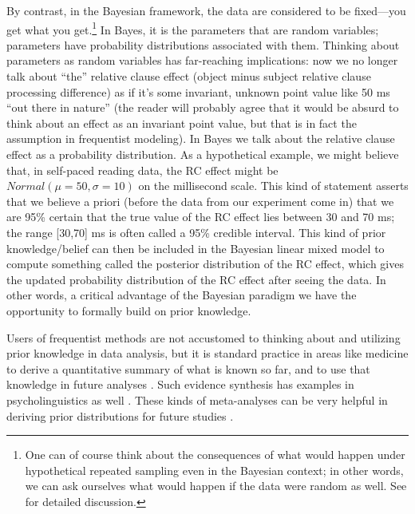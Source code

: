 \documentclass{ar-1col}\usepackage[]{graphicx}\usepackage[]{color}
\begin{document}
By contrast, in the Bayesian framework, the data are considered to be fixed---you get what you get.\footnote{One can of course think about the consequences of what would happen under hypothetical repeated sampling even in the Bayesian context; in other words, we can ask ourselves what would happen if the data were random as well. See \citet{SchadEtAlWorkflow,SchadEtAlBF,vasishth2021sample} for detailed discussion.} In Bayes, it is the parameters that are random variables; parameters have probability distributions associated with them. Thinking about parameters as random variables has far-reaching implications: now we no longer talk about ``the'' relative clause effect (object minus subject relative clause processing difference) as if it's some invariant, unknown point value like 50 ms ``out there in nature'' (the reader will probably agree that it would be absurd to think about an effect as an invariant point value, but that is in fact the assumption in frequentist modeling). 
In Bayes we talk about the relative clause effect as a probability distribution. As a hypothetical example, we might believe \citep[based on prior data or theory or computational modeling; see][for how such prior information can be derived]{ohagan2006uncertain,NicenboimEtAlBayes2019} that, in self-paced reading data, the RC effect might be $Normal(\mu=50,\sigma=10)$ on the millisecond scale. This kind of statement asserts that we believe a priori (before the data from our experiment come in) that we are 95\% certain that the true value of the RC effect lies between 30 and 70 ms; the range [30,70] ms is often called a 95\% credible interval. This kind of prior knowledge/belief can then be included in the Bayesian linear mixed model to compute something called the posterior distribution of the RC effect, which gives the updated probability distribution of the RC effect after seeing the data. In other words, a critical advantage of the Bayesian paradigm we have the opportunity to formally build on prior knowledge.

Users of frequentist methods are not accustomed to thinking about and utilizing prior knowledge in data analysis, but it is standard practice in areas like medicine \citep{cochrane} to derive a quantitative summary of what is known so far, and to use that knowledge in future analyses \citep{spiegelhalter1994bayesian}. Such evidence synthesis has examples in psycholinguistics as well \citep{VasishthetalPLoSOne2013,mahowald2016meta,JaegerEngelmannVasishth2017,NicenboimRoettgeretal,NicenboimPreactivation2019,BuerkiEtAl2020,cox2022bayesian}. These kinds of meta-analyses can be very helpful in deriving prior distributions for future studies \citep{NicenboimEtAlBayes2019,VasishthEngelmann2020}.
\end{document}

